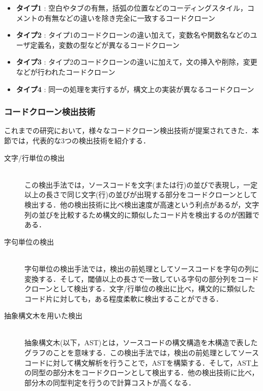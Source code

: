 \documentclass[12pt]{jarticle} %
\begin{document}
\begin{itemize}
\item \textbf{タイプ1} : 空白やタブの有無，括弧の位置などのコーディングスタイル，コメントの有無などの違いを除き完全に一致するコードクローン
\item \textbf{タイプ2} : タイプ1のコードクローンの違い加えて，変数名や関数名などのユーザ定義名，変数の型などが異なるコードクローン
\item \textbf{タイプ3} : タイプ2のコードクローンの違いに加えて，文の挿入や削除，変更などが行われたコードクローン
\item \textbf{タイプ4} : 同一の処理を実行するが，構文上の実装が異なるコードクローン
\end{itemize}

\subsubsection{コードクローン検出技術}
これまでの研究において，様々なコードクローン検出技術が提案されてきた\cite{c6,c1}．本節では，代表的な3つの検出技術を紹介する．

\begin{description}
\item[文字/行単位の検出]~\\
この検出手法では，ソースコードを文字(または行)の並びで表現し，一定以上の長さで同じ文字(行)の並びが出現する部分をコードクローンとして検出する．他の検出技術に比べ検出速度が高速という利点があるが，文字列の並びを比較するため構文的に類似したコード片を検出するのが困難である．
\item[字句単位の検出]~\\
字句単位の検出手法では，検出の前処理としてソースコードを字句の列に変換する．そして，閾値以上の長さで一致している字句の部分列をコードクローンとして検出する．文字/行単位の検出に比べ，構文的に類似したコード片に対しても，ある程度柔軟に検出することができる．
\item[抽象構文木を用いた検出]~\\
抽象構文木(以下，AST)とは，ソースコードの構文構造を木構造で表したグラフのことを意味する．この検出手法では，検出の前処理としてソースコードに対して構文解析を行うことで，ASTを構築する．そして，AST上の同型の部分木をコードクローンとして検出する．他の検出技術に比べ，部分木の同型判定を行うので計算コストが高くなる．
\end{description}
\end{document}
